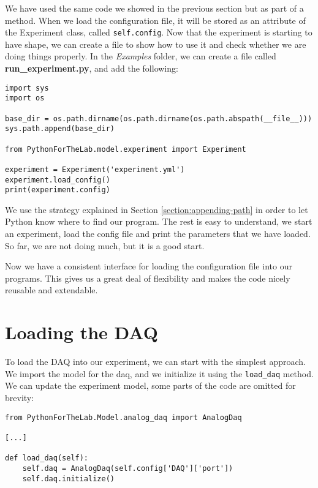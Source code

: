 We have used the same code we showed in the previous section but as part of a method. When we load the configuration file, it will be stored as an attribute of the Experiment class, called \texttt{self.config}. Now that the experiment is starting to have shape, we can create a file to show how to use it and check whether we are doing things properly. In the \emph{Examples} folder, we can create a file called \textbf{run\_experiment.py}, and add the following:

\begin{verbatim}
import sys
import os

base_dir = os.path.dirname(os.path.dirname(os.path.abspath(__file__)))
sys.path.append(base_dir)

from PythonForTheLab.model.experiment import Experiment

experiment = Experiment('experiment.yml')
experiment.load_config()
print(experiment.config)
\end{verbatim}

We use the strategy explained in Section \ref{section:appending-path} in order to let Python know where to find our program. The rest is easy to understand, we start an experiment, load the config file and print the parameters that we have loaded. So far, we are not doing much, but it is a good start. 

Now we have a consistent interface for loading the configuration file into our programs. This gives us a great deal of flexibility and makes the code nicely reusable and extendable. 


\section{Loading the DAQ}\label{section:loading-daq}
To load the DAQ into our experiment, we can start with the simplest approach. We import the model for the daq, and we initialize it using the \texttt{load\_daq} method. We can update the experiment model, some parts of the code are omitted for brevity:

\begin{verbatim}
from PythonForTheLab.Model.analog_daq import AnalogDaq

[...]

def load_daq(self):
    self.daq = AnalogDaq(self.config['DAQ']['port'])
    self.daq.initialize()
\end{verbatim}

